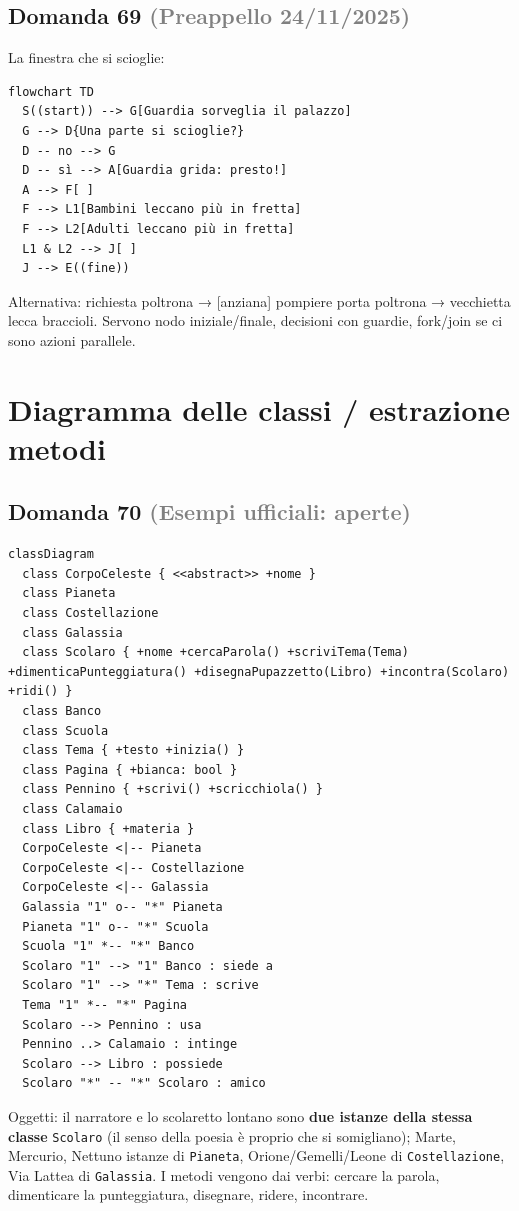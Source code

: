 \documentclass[a4paper,11pt]{article}
\begin{document}
\subsection*{Domanda 69 \hfill {\small \textcolor{gray}{(Preappello 24/11/2025)}}}
La finestra che si scioglie:

\begin{verbatim}
flowchart TD
  S((start)) --> G[Guardia sorveglia il palazzo]
  G --> D{Una parte si scioglie?}
  D -- no --> G
  D -- sì --> A[Guardia grida: presto!]
  A --> F[ ]
  F --> L1[Bambini leccano più in fretta]
  F --> L2[Adulti leccano più in fretta]
  L1 & L2 --> J[ ]
  J --> E((fine))
\end{verbatim}
Alternativa: richiesta poltrona → [anziana] pompiere porta poltrona → vecchietta lecca braccioli. Servono nodo iniziale/finale, decisioni con guardie, fork/join se ci sono azioni parallele.



\section{Diagramma delle classi / estrazione metodi}

\subsection*{Domanda 70 \hfill {\small \textcolor{gray}{(Esempi ufficiali: aperte)}}}


\begin{verbatim}
classDiagram
  class CorpoCeleste { <<abstract>> +nome }
  class Pianeta
  class Costellazione
  class Galassia
  class Scolaro { +nome +cercaParola() +scriviTema(Tema) +dimenticaPunteggiatura() +disegnaPupazzetto(Libro) +incontra(Scolaro) +ridi() }
  class Banco
  class Scuola
  class Tema { +testo +inizia() }
  class Pagina { +bianca: bool }
  class Pennino { +scrivi() +scricchiola() }
  class Calamaio
  class Libro { +materia }
  CorpoCeleste <|-- Pianeta
  CorpoCeleste <|-- Costellazione
  CorpoCeleste <|-- Galassia
  Galassia "1" o-- "*" Pianeta
  Pianeta "1" o-- "*" Scuola
  Scuola "1" *-- "*" Banco
  Scolaro "1" --> "1" Banco : siede a
  Scolaro "1" --> "*" Tema : scrive
  Tema "1" *-- "*" Pagina
  Scolaro --> Pennino : usa
  Pennino ..> Calamaio : intinge
  Scolaro --> Libro : possiede
  Scolaro "*" -- "*" Scolaro : amico
\end{verbatim}
Oggetti: il narratore e lo scolaretto lontano sono \textbf{due istanze della stessa classe} \texttt{Scolaro} (il senso della poesia è proprio che si somigliano); Marte, Mercurio, Nettuno istanze di \texttt{Pianeta}, Orione/Gemelli/Leone di \texttt{Costellazione}, Via Lattea di \texttt{Galassia}. I metodi vengono dai verbi: cercare la parola, dimenticare la punteggiatura, disegnare, ridere, incontrare.
\end{document}
